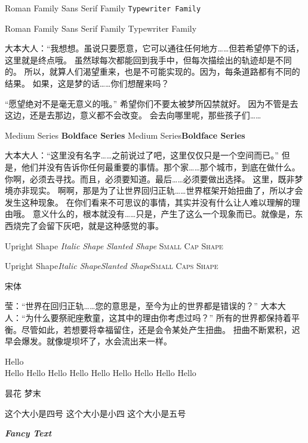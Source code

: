 \documentclass[12pt]{article}%
\newcommand{\myfont}{\textit{\textbf{\textsf{Fancy Text}}}}
\begin{document}
\textrm{Roman Family} \textsf{Sans Serif Family} \texttt{Typewriter Family} 

\rmfamily Roman Family  {\sffamily Sans Serif Family} {\ttfamily Typewriter Family}

\ttfamily
大本大人：“我想想。虽说只要愿意，它可以通往任何地方……但若希望停下的话，这里就是终点哦。
虽然球每次都能回到我手中，但每次描绘出的轨迹却是不同的。
所以，就算人们渴望重来，也是不可能实现的。因为，每条道路都有不同的结果。
如果，这是梦的话……你们想醒来吗？

“愿望绝对不是毫无意义的哦。”
希望你们不要太被梦所囚禁就好。
因为不管是去这边，还是去那边，意义都不会改变。
会去向哪里呢，那些孩子们……

\sffamily
\textmd{Medium Series} \textbf{Boldface Series}%
{\mdseries Medium Series}{\bfseries Boldface Series}

大本大人：“这里没有名字……之前说过了吧，这里仅仅只是一个空间而已。”
但是，他们并没有告诉你任何最重要的事情。那个家……那个城市，到底在做什么。
你啊，必须去寻找。而且，必须要知道。最后……必须要做出选择。
这里，既非梦境亦非现实。
啊啊，那是为了让世界回归正轨……世界框架开始扭曲了，所以才会发生这种现象。
在你们看来不可思议的事情，其实并没有什么让人难以理解的理由哦。
意义什么的，根本就没有……只是，产生了这么一个现象而已。就像是，东西烧完了会留下灰吧，就是这种感觉的事。

\textup{Upright Shape} \textit{Italic Shape}
\textsl{Slanted Shape} \textsc{Small Cap Shape}

{\upshape Upright Shape}{\itshape Italic Shape}{\slshape Slanted Shape}{\scshape Small Caps Shape}


{\songti 宋体}  

{\songti
莹：“世界在回归正轨……您的意思是，至今为止的世界都是错误的？”
大本大人：“为什么要祭祀座敷童，这其中的理由你考虑过吗？”
所有的世界都保持着平衡。尽管如此，若想要将幸福留住，还是会令某处产生扭曲。
扭曲不断累积，迟早会爆发。就像堤坝坏了，水会流出来一样。}

{\tiny Hello}\\ %
{\scriptsize Hello}
{\footnotesize Hello}
{\small Hello}
{\normalsize Hello}
{\large Hello}
{\Large Hello}
{\LARGE Hello}
{\huge Hello}
{\Huge Hello}


 昙花
 梦末

 这个大小是四号
 这个大小是小四
 这个大小是五号

\myfont
\end{document}
